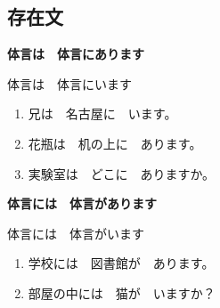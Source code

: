 \subsection{存在文}%

{\bf
\noindent 体言は　体言にあります

\noindent 体言は　体言にいます
}

\begin{enumerate}
  \item 兄は　名古屋に　います。
  \item 花瓶は　机の上に　あります。
  \item 実験室は　どこに　ありますか。
\end{enumerate}

{\bf
\noindent 体言には　体言があります

\noindent 体言には　体言がいます
}

\begin{enumerate}
  \item 学校には　図書館が　あります。
  \item 部屋の中には　猫が　いますか？
\end{enumerate}

